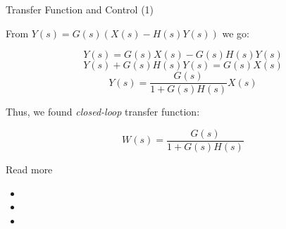 \documentclass{beamer}
\begin{document}
\begin{frame}{Transfer Function and Control (1)}
	\begin{flushleft}
		
		From $Y(s)  = G(s) (X(s)  - H(s) Y(s) )$ we go:
		
		\begin{equation}
			Y(s)  = G(s)X(s) - G(s)H(s) Y(s) 
		\end{equation}
		\begin{equation}
			Y(s)  + G(s)H(s) Y(s)  = G(s)X(s)
		\end{equation}
		\begin{equation}
			Y(s)  = \frac{G(s)}{1 + G(s)H(s)} X(s)
		\end{equation}
		
		Thus, we found \emph{closed-loop} transfer function:
		
		\begin{equation}
			W(s) = \frac{G(s)}{1 + G(s)H(s)}
		\end{equation}
		
	\end{flushleft}
\end{frame}



\begin{frame}{Read more}

\begin{itemize}
\item {}

\item {}

\item {}

\end{itemize}

\end{frame}



\myqrframe
\end{document}
